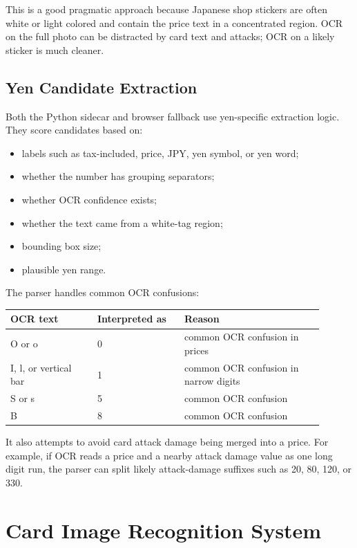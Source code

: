 \documentclass[11pt,a4paper]{article}
\begin{document}
This is a good pragmatic approach because Japanese shop stickers are often white or light colored and contain the price text in a concentrated region. OCR on the full photo can be distracted by card text and attacks; OCR on a likely sticker is much cleaner.

\subsection{Yen Candidate Extraction}

Both the Python sidecar and browser fallback use yen-specific extraction logic. They score candidates based on:

\begin{itemize}
  \item labels such as tax-included, price, JPY, yen symbol, or yen word;
  \item whether the number has grouping separators;
  \item whether OCR confidence exists;
  \item whether the text came from a white-tag region;
  \item bounding box size;
  \item plausible yen range.
\end{itemize}

The parser handles common OCR confusions:

\begin{longtable}{p{0.25\linewidth} p{0.25\linewidth} p{0.4\linewidth}}
\toprule
OCR text & Interpreted as & Reason \\
\midrule
O or o & 0 & common OCR confusion in prices \\
I, l, or vertical bar & 1 & common OCR confusion in narrow digits \\
S or s & 5 & common OCR confusion \\
B & 8 & common OCR confusion \\
\bottomrule
\end{longtable}

It also attempts to avoid card attack damage being merged into a price. For example, if OCR reads a price and a nearby attack damage value as one long digit run, the parser can split likely attack-damage suffixes such as 20, 80, 120, or 330.

\section{Card Image Recognition System}
\end{document}

